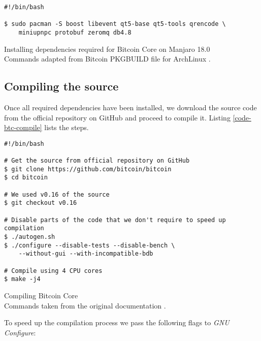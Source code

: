 \begin{listing}[!htb]
    \begin{verbatim}
#!/bin/bash

$ sudo pacman -S boost libevent qt5-base qt5-tools qrencode \
    miniupnpc protobuf zeromq db4.8

\end{verbatim}

\caption[Installing dependencies required for Bitcoin Core on Manjaro 18.0]
{
    Installing dependencies required for Bitcoin Core on Manjaro 18.0 \\
    \footnotesize
    Commands adapted from Bitcoin PKGBUILD file for ArchLinux \cite{bitcoinBuildArch}.
    }
    \label{code-btc-deps-arch}
\end{listing}

\subsection*{Compiling the source}

Once all required dependencies have been installed, we download the source code from the official repository on GitHub and proceed to compile it. Listing \ref{code-btc-compile} lists the steps. 

\begin{listing}[!htb]
    \begin{verbatim}
#!/bin/bash

# Get the source from official repository on GitHub
$ git clone https://github.com/bitcoin/bitcoin
$ cd bitcoin

# We used v0.16 of the source
$ git checkout v0.16

# Disable parts of the code that we don't require to speed up compilation
$ ./autogen.sh
$ ./configure --disable-tests --disable-bench \
    --without-gui --with-incompatible-bdb

# Compile using 4 CPU cores
$ make -j4

    \end{verbatim}

    \caption[Compiling Bitcoin Core]
    {
    Compiling Bitcoin Core \\
    \footnotesize
    Commands taken from the original documentation \cite{bitcoinBuildUnix}.
    }
    \label{code-btc-compile}
\end{listing}

\newpage
To speed up the compilation process we pass the following flags to \textit{GNU Configure}:

